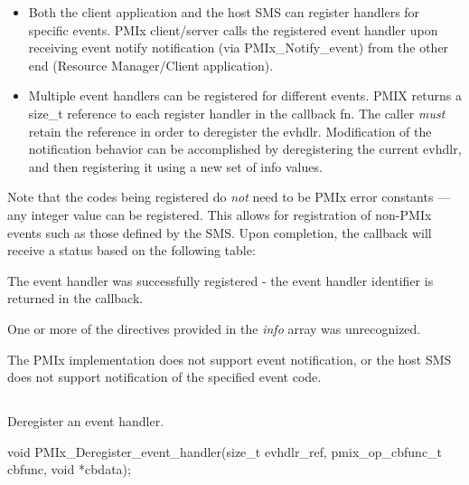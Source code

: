 \begin{itemize}

\item Both the client application and the host \ac{SMS} can register handlers for specific events. \ac{PMIx} client/server calls the registered event handler upon receiving event notify notification (via PMIx_Notify_event) from the other end (Resource Manager/Client application).

\item Multiple event handlers can be registered for different events. PMIX returns a size_t reference to each register handler in the callback fn. The caller \textit{must} retain the reference in order to deregister the evhdlr. Modification of the notification behavior can be accomplished by deregistering the current evhdlr, and then registering it using a new set of info values.
\end{itemize}

Note that the codes being registered do \textit{not} need to be \ac{PMIx} error constants --- any integer value can be registered. This allows for registration of non-PMIx events such as those defined by the \ac{SMS}. Upon completion, the callback will receive a status based on the following table:

\begin{constantdesc}
\item {} The event handler was successfully registered - the event handler identifier is returned in the callback.
\item {} One or more of the directives provided in the \textit{info} array was unrecognized.
\item {} The \ac{PMIx} implementation does not support event notification, or the host \ac{SMS} does not support notification of the specified event code.
\end{constantdesc}



\subsection{}

\summary

Deregister an event handler.

\format

\cspecificstart
\begin{codepar}
void
PMIx_Deregister_event_handler(size_t evhdlr_ref,
                              pmix_op_cbfunc_t cbfunc,
                              void *cbdata);
\end{codepar}
\cspecificend

